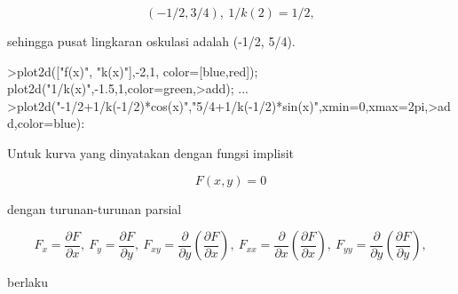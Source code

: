 \documentclass[a4paper,10pt]{article}
\begin{document}
\begin{eulernotebook}
\begin{eulercomment}
\begin{eulercomment}
\begin{eulercomment}
\begin{eulercomment}
\begin{eulercomment}
\begin{eulercomment}
\begin{eulercomment}
\begin{eulercomment}
\begin{eulercomment}
\begin{eulercomment}
\begin{eulercomment}
\begin{eulercomment}
\begin{eulercomment}
\begin{eulercomment}
\begin{eulercomment}
\begin{eulercomment}
\begin{eulercomment}
\end{eulercomment}
\begin{eulerformula}
\[
(-1/2,3/4),\ 1/k(2)=1/2,
\]
\end{eulerformula}
\begin{eulercomment}
sehingga pusat lingkaran oskulasi adalah (-1/2, 5/4).
\end{eulercomment}
\begin{eulerprompt}
>plot2d(["f(x)", "k(x)"],-2,1, color=[blue,red]); plot2d("1/k(x)",-1.5,1,color=green,>add); ...
>plot2d("-1/2+1/k(-1/2)*cos(x)","5/4+1/k(-1/2)*sin(x)",xmin=0,xmax=2pi,>add,color=blue):
\end{eulerprompt}
\begin{eulercomment}
Untuk kurva yang dinyatakan dengan fungsi implisit

\end{eulercomment}
\begin{eulerformula}
\[
F(x,y)=0
\]
\end{eulerformula}
\begin{eulercomment}
dengan turunan-turunan parsial

\end{eulercomment}
\begin{eulerformula}
\[
F_x=\frac{\partial F}{\partial x},\ F_y=\frac{\partial F}{\partial y},\ F_{xy}=\frac{\partial}{\partial y}\left(\frac{\partial F}{\partial x}\right),\ F_{xx}=\frac{\partial}{\partial x}\left(\frac{\partial F}{\partial x}\right),\ F_{yy}=\frac{\partial}{\partial y}\left(\frac{\partial F}{\partial y}\right),
\]
\end{eulerformula}
\begin{eulercomment}
berlaku


\end{eulercomment}
\end{eulercomment}
\end{eulercomment}
\end{eulercomment}
\end{eulercomment}
\end{eulercomment}
\end{eulercomment}
\end{eulercomment}
\end{eulercomment}
\end{eulercomment}
\end{eulercomment}
\end{eulercomment}
\end{eulercomment}
\end{eulercomment}
\end{eulercomment}
\end{eulercomment}
\end{eulercomment}
\end{eulernotebook}
\end{document}
